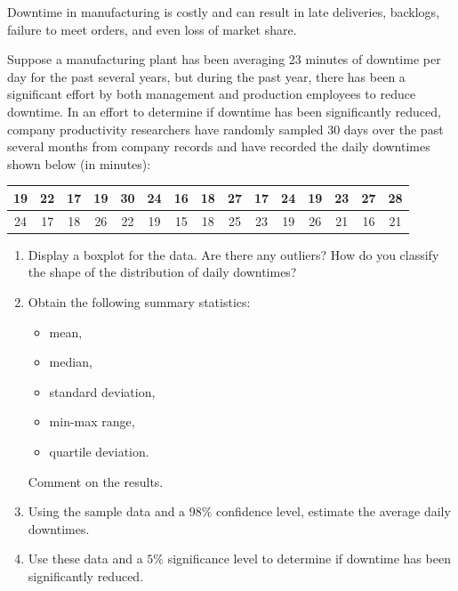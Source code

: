 \vspace{-0.25cm}
\hspace{-0.25cm}
\begin{Exercise}
    Downtime in manufacturing is costly and can result in 
    late deliveries, backlogs, failure to meet orders, and even 
    loss of market share. 

    Suppose a manufacturing plant has been averaging 23 minutes 
    of downtime per day for the past several years, but during the 
    past year, there has been a significant effort by both 
    management and production employees to reduce downtime. 
    In an effort to determine if downtime has been significantly reduced,
    company productivity researchers have randomly sampled 30 days over the past several
    months from company records and have recorded the daily downtimes shown 
    below (in minutes):

    \begin{center}
        \begin{tabular}{|c|c|c|c|c|c|c|c|c|c|c|c|c|c|c|}
        \hline
        19 & 22 & 17 & 19 & 30 & 24 & 16 & 18 & 27 & 17 & 24 & 19 & 23 & 27 & 28\\
        \hline
        24 & 17 & 18 & 26 & 22 & 19 & 15 & 18 & 25 & 23 & 19 & 26 & 21 & 16 & 21\\
        \hline
        \end{tabular}
    \end{center}

    \begin{enumerate}
        \item Display a boxplot for the data. Are there any outliers? How do you 
        classify the shape of the distribution of daily downtimes?
        \item Obtain the following summary statistics:
        \begin{itemize}
            \item mean,
            \item median,
            \item standard deviation,
            \item min-max range,
            \item quartile deviation.
        \end{itemize}
        Comment on the results.
        \item Using the sample data and a $98\%$ confidence level, estimate the average daily downtimes.
        \item Use these data and a $5\%$ significance level to determine if downtime has been 
        significantly reduced.
    \end{enumerate}
\end{Exercise}

